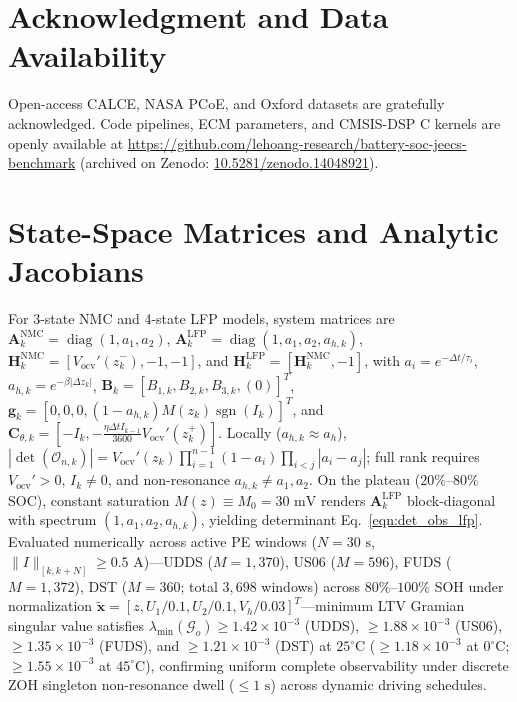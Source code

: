 \documentclass[balance,nocopyright,upint,varvw,hyphenate,barcolor=NavyBlue,nolists]{asmejour}
\begin{document}
\section*{Acknowledgment and Data Availability}
{\sloppy Open-access CALCE, NASA PCoE, and Oxford datasets are gratefully acknowledged. Code pipelines, ECM parameters, and CMSIS-DSP C kernels are openly available at \url{https://github.com/lehoang-research/battery-soc-jeecs-benchmark} (archived on Zenodo: \href{https://doi.org/10.5281/zenodo.14048921}{10.5281/zenodo.14048921}).\par}

\appendix
\section{State-Space Matrices and Analytic Jacobians\label{app:jacobians}}
For 3-state NMC and 4-state LFP models, system matrices are $\mathbf{A}_k^{\text{NMC}} = \operatorname{diag}(1, a_1, a_2)$, $\mathbf{A}_k^{\text{LFP}} = \operatorname{diag}(1, a_1, a_2, a_{h,k})$, $\mathbf{H}_k^{\text{NMC}} = [V_{\text{ocv}}'(\hat{z}_k^-), -1, -1]$, and $\mathbf{H}_k^{\text{LFP}} = [\mathbf{H}_k^{\text{NMC}}, -1]$, with $a_i = e^{-\Delta t/\tau_i}$, $a_{h,k} = e^{-\beta|\Delta z_k|}$, $\mathbf{B}_k = [B_{1,k}, B_{2,k}, B_{3,k}, (0)]^T$, $\mathbf{g}_k = [0, 0, 0, (1 - a_{h,k}) M(z_k) \operatorname{sgn}(I_k)]^T$, and $\mathbf{C}_{\theta,k} = [-I_k, -\tfrac{\eta \Delta t I_{k-1}}{3600} V_{\text{ocv}}'(\hat{z}_k^+)]$. Locally ($a_{h,k} \approx a_h$), $|\det(\mathcal{O}_{n,k})| = V_{\text{ocv}}'(z_k) \prod_{i=1}^{n-1}(1 - a_i) \prod_{i < j} |a_i - a_j|$; full rank requires $V_{\text{ocv}}' > 0$, $I_k \ne 0$, and non-resonance $a_{h,k} \ne a_1, a_2$. On the plateau ($20\%\text{--}80\%$ SOC), constant saturation $M(z) \equiv M_0 = 30\text{ mV}$ renders $\mathbf{A}_k^{\text{LFP}}$ block-diagonal with spectrum $(1, a_1, a_2, a_{h,k})$, yielding determinant Eq.~\eqref{eqn:det_obs_lfp}. Evaluated numerically across active PE windows ($N=30\text{ s}$, $\|I\|_{[k,k+N]} \ge 0.5\text{ A}$)—UDDS ($M = 1,370$), US06 ($M = 596$), FUDS ($M = 1,372$), DST ($M = 360$; total $3,698$ windows) across $80\%\text{--}100\%$ SOH under normalization $\tilde{\mathbf{x}} = [z, U_1/0.1, U_2/0.1, V_h/0.03]^T$—minimum LTV Gramian singular value satisfies $\lambda_{\min}(\mathcal{G}_o) \ge 1.42 \times 10^{-3}$ (UDDS), $\ge 1.88 \times 10^{-3}$ (US06), $\ge 1.35 \times 10^{-3}$ (FUDS), and $\ge 1.21 \times 10^{-3}$ (DST) at $25^\circ\text{C}$ ($\ge 1.18 \times 10^{-3}$ at $0^\circ\text{C}$; $\ge 1.55 \times 10^{-3}$ at $45^\circ\text{C}$), confirming uniform complete observability under discrete ZOH singleton non-resonance dwell ($\le 1\text{ s}$) across dynamic driving schedules.
\end{document}
